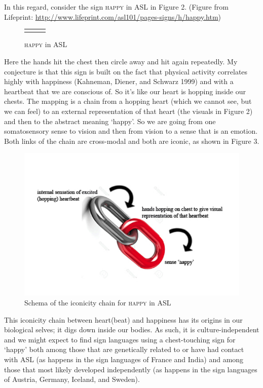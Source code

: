 \documentclass[output=paper,
modfonts
]{LSP/langsci}
\begin{document}
In this regard, consider the sign \textsc{happy} in ASL in Figure 2.
(Figure from Lifeprint:
\url{http://www.lifeprint.com/asl101/pages-signs/h/happy.htm})


\begin{figure}
	\begin{tabularx}{\linewidth}{CCC}
		  &  &  \\
	\end{tabularx}
	\caption{\textsc{happy} in ASL}
	\label{fig:2}
\end{figure}

Here the hands hit the chest then circle away and hit again repeatedly.
My conjecture is that this sign is built on the fact that physical
activity correlates highly with happiness (Kahneman, Diener, and Schwarz
1999) and with a heartbeat that we are conscious of. So it's like our
heart is hopping inside our chests. The mapping is a chain from a
hopping heart (which we cannot see, but we can feel) to an external
representation of that heart (the visuals in Figure 2) and then to the
abstract meaning `happy'. So we are going from one somatosensory sense
to vision and then from vision to a sense that is an emotion. Both links
of the chain are cross-modal and both are iconic, as shown in Figure 3.

\begin{figure}
	\includegraphics{napoli_fig3.png}
	\caption{Schema of the iconicity chain for \textsc{happy} in ASL}
	\label{fig:3}
\end{figure}

This iconicity chain between heart(beat) and happiness has its origins
in our biological selves; it digs down inside our bodies. As such, it is
culture-independent and we might expect to find sign languages using a
chest-touching sign for `happy' both among those that are genetically
related to or have had contact with ASL (as happens in the sign
languages of France and India) and among those that most likely
developed independently (as happens in the sign languages of Austria,
Germany, Iceland, and Sweden).
\end{document}
